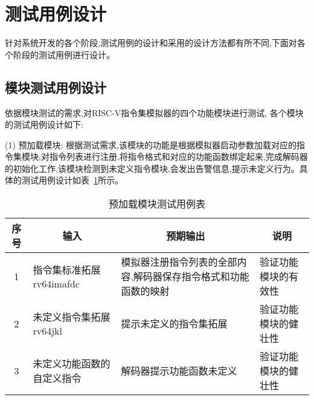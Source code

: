 \section{测试用例设计}
针对系统开发的各个阶段,测试用例的设计和采用的设计方法都有所不同,下面对各个阶段的测试用例进行设计。

\subsection{模块测试用例设计}
依据模块测试的需求,对RISC-V指令集模拟器的四个功能模块进行测试, 各个模块的测试用例设计如下:


(1) 预加载模块: 根据测试需求,该模块的功能是根据模拟器启动参数加载对应的指令集模块,对指令列表进行注册,将指令格式和对应的功能函数绑定起来,完成解码器的初始化工作,该模块检测到未定义指令模块,会发出告警信息,提示未定义行为。具体的测试用例设计如表~\ref{tab:test1}所示。
\begin{table}[h]
    \centering
    \caption{预加载模块测试用例表}
    \label{tab:test1}
    \renewcommand\arraystretch{1.2}
    \begin{tabular}{clll}
      \toprule
      \multicolumn{1}{c}{序号} & \multicolumn{1}{c}{输入} & \multicolumn{1}{c}{预期输出} &\multicolumn{1}{c}{说明}\\
      \midrule
  1	& \multicolumn{1}{m{3.5cm}}{指令集标准拓展rv64imafdc} & \multicolumn{1}{m{3.5cm}}{模拟器注册指令列表的全部内容,解码器保存指令格式和功能函数的映射} & \multicolumn{1}{m{3.5cm}}{验证功能模块的有效性}\\
  \hline
  2	& \multicolumn{1}{m{3.5cm}}{未定义指令集拓展rv64jkl} & \multicolumn{1}{m{3.5cm}}{提示未定义的指令集拓展} & \multicolumn{1}{m{3.5cm}}{验证功能模块的健壮性}\\
  \hline
  3	& \multicolumn{1}{m{3.5cm}}{未定义功能函数的自定义指令} & \multicolumn{1}{m{3.5cm}}{解码器提示功能函数未定义} & \multicolumn{1}{m{3.5cm}}{验证功能模块的健壮性}\\
      \bottomrule
    \end{tabular}
\end{table}


